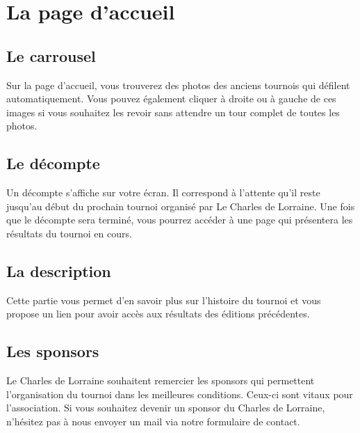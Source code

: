 \section{La page d'accueil}

\subsection{Le carrousel}

Sur la page d'accueil, vous trouverez des photos des anciens tournois qui
défilent automatiquement. Vous pouvez également cliquer à droite ou à gauche
de ces images si vous souhaitez les revoir sans attendre un tour complet de
toutes les photos. \newline

\subsection{Le décompte}

Un décompte s'affiche sur votre écran. Il correspond à l'attente qu'il reste
jusqu'au début du prochain tournoi organisé par Le Charles de Lorraine. Une
fois que le décompte sera terminé, vous pourrez accéder à une page qui
présentera les résultats du tournoi en cours. \newline

\subsection{La description}

Cette partie vous permet d'en savoir plus sur l'histoire du tournoi et vous
propose un lien pour avoir accès aux résultats des éditions précédentes.

\subsection{Les sponsors}

Le Charles de Lorraine souhaitent remercier les sponsors qui permettent
l'organisation du tournoi dans les meilleures conditions. Ceux-ci sont vitaux
pour l'association. Si vous souhaitez devenir un sponsor du Charles de Lorraine,
n'hésitez pas à nous envoyer un mail via notre formulaire de contact.
